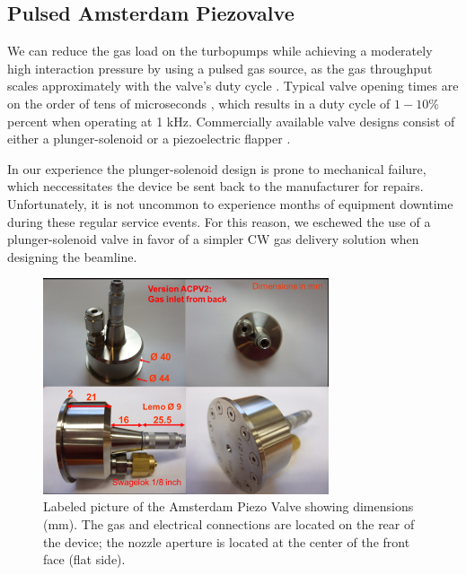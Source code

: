 \subsection{Pulsed Amsterdam Piezovalve}

We can reduce the gas load on the turbopumps while achieving a moderately high interaction pressure by using a pulsed gas source, as the gas throughput scales approximately with the valve's duty cycle \cite{christenStationaryFlowConditions2013}. Typical valve opening times are on the order of tens of microseconds \cite{irimiaSituCharacterizationCold2009,mengMeasurementDensityProfile2015,irimiaShortPulseMicrosecond2009}, which results in a duty cycle of $1 - 10 \%$ percent when operating at 1 kHz. Commercially available valve designs consist of either a plunger-solenoid \cite{evenEvenLavieValveSource2015} or a piezoelectric flapper \cite{irimiaSituCharacterizationCold2009,mengMeasurementDensityProfile2015,irimiaShortPulseMicrosecond2009}.

In our experience the plunger-solenoid design is prone to mechanical failure, which neccessitates the device be sent back to the manufacturer for repairs. Unfortunately, it is not uncommon to experience months of equipment downtime during these regular service events. For this reason, we eschewed the use of a plunger-solenoid valve in favor of a simpler CW gas delivery solution when designing the beamline.

\begin{figure}
	\centering
	\includegraphics[width=0.75\textwidth]{figures/chap3/piezovalve_picture.png}
	\caption{Labeled picture of the Amsterdam Piezo Valve showing dimensions (mm). The gas and electrical connections are located on the rear of the device; the nozzle aperture is located at the center of the front face (flat side).}
	\label{fig:piezovalve_picture}
\end{figure}

